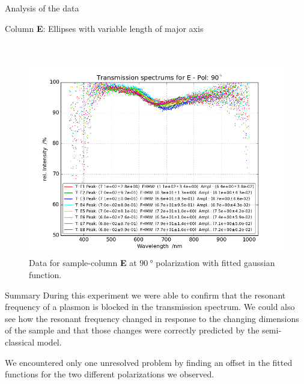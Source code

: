 \documentclass[pdftex, a4paper,11pt, twoside, UKenglish]{report}
\begin{document}
\begin{chapter}{Analysis of the data}
\begin{section}{Column \textbf{E}: Ellipses with variable length of
        major axis}
\begin{figure}[ht!]
\begin{minipage}{.95\textwidth}
          \label{fig:TransspecFIT_EPol0}
        \end{minipage}\\
        \begin{minipage}{.95\textwidth}
          \centering
          \includegraphics[width=\textwidth]
              {Figures/TransspecFIT_EPol90.png}
          \caption{Data for sample-column \textbf{E} at $\SI{90}{\degree}$
              polarization with fitted gaussian function.}
          \label{fig:TransspecFIT_EPol90}
        \end{minipage}
      \end{figure}
      
    \end{section}
    
    
    
    \begin{section}{Summary}
      \label{chp:AnalysisSummary}
      During this experiment we were able to confirm that the resonant frequency
      of a plasmon is blocked in the transmission spectrum.
      We could also see how the resonant frequency changed in response to the
      changing dimensions of the sample and that those changes were correctly
      predicted by the semi-classical model.

      We encountered only one unresolved problem by finding an offset in the
      fitted functions for the two different polarizations we observed.
      
    \end{section}
   
  \end{chapter}
  
\end{document}
